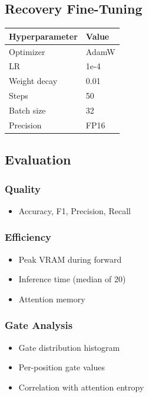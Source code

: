 \subsection{Recovery Fine-Tuning}

\begin{table}[H]
\centering
\small
\begin{tabular}{ll}
\toprule
\textbf{Hyperparameter} & \textbf{Value} \\
\midrule
Optimizer & AdamW \\
LR & 1e-4 \\
Weight decay & 0.01 \\
Steps & 50 \\
Batch size & 32 \\
Precision & FP16 \\
\bottomrule
\end{tabular}
\end{table}

\subsection{Evaluation}

\subsubsection{Quality}
\begin{itemize}
\item Accuracy, F1, Precision, Recall

\end{itemize}
\subsubsection{Efficiency}
\begin{itemize}
\item Peak VRAM during forward
\item Inference time (median of 20)
\item Attention memory

\end{itemize}
\subsubsection{Gate Analysis}
\begin{itemize}
\item Gate distribution histogram
\item Per-position gate values
\item Correlation with attention entropy

\end{itemize}
